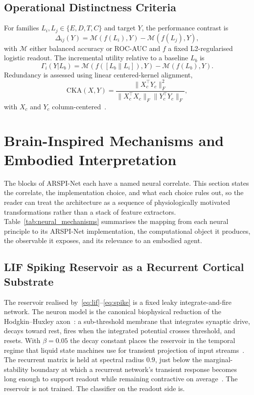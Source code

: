 \documentclass[journal]{IEEEtran}
\begin{document}
\subsection{Operational Distinctness Criteria}
For families $L_i,L_j\in\{E,D,T,C\}$ and target $Y$, the performance contrast is
\begin{equation}
\Delta_{ij}(Y)=\mathcal{M}(f(L_i),Y)-\mathcal{M}(f(L_j),Y),
\label{eq:contrast}
\end{equation}
with $\mathcal{M}$ either balanced accuracy or ROC-AUC and $f$ a fixed L2-regularised logistic readout. The incremental utility relative to a baseline $L_b$ is
\begin{equation}
\Gamma_i(Y|L_b)=\mathcal{M}(f([L_b\|L_i]),Y)-\mathcal{M}(f(L_b),Y).
\label{eq:increment}
\end{equation}
Redundancy is assessed using linear centered-kernel alignment,
\begin{equation}
\mathrm{CKA}(X,Y)=\frac{\|X_c^{\top}Y_c\|_F^2}{\|X_c^{\top}X_c\|_F\|Y_c^{\top}Y_c\|_F},
\label{eq:cka}
\end{equation}
with $X_c$ and $Y_c$ column-centered~\cite{kornblith2019similarity}.

\section{Brain-Inspired Mechanisms and Embodied Interpretation}\label{sec:mechanisms}

The blocks of ARSPI-Net each have a named neural correlate. This section states the correlate, the implementation choice, and what each choice rules out, so the reader can treat the architecture as a sequence of physiologically motivated transformations rather than a stack of feature extractors. Table~\ref{tab:neural_mechanisms} summarises the mapping from each neural principle to its ARSPI-Net implementation, the computational object it produces, the observable it exposes, and its relevance to an embodied agent.



\subsection{LIF Spiking Reservoir as a Recurrent Cortical Substrate}
The reservoir realised by~\eqref{eq:lif}--\eqref{eq:spike} is a fixed leaky integrate-and-fire network. The neuron model is the canonical biophysical reduction of the Hodgkin--Huxley axon~\cite{hodgkin1952quantitative}: a sub-threshold membrane that integrates synaptic drive, decays toward rest, fires when the integrated potential crosses threshold, and resets. With $\beta=0.05$ the decay constant places the reservoir in the temporal regime that liquid state machines use for transient projection of input streams~\cite{maass2002liquid}. The recurrent matrix is held at spectral radius $0.9$, just below the marginal-stability boundary at which a recurrent network's transient response becomes long enough to support readout while remaining contractive on average~\cite{jaeger2001echo,sussillo2009generating}. The reservoir is not trained. The classifier on the readout side is.
\end{document}
